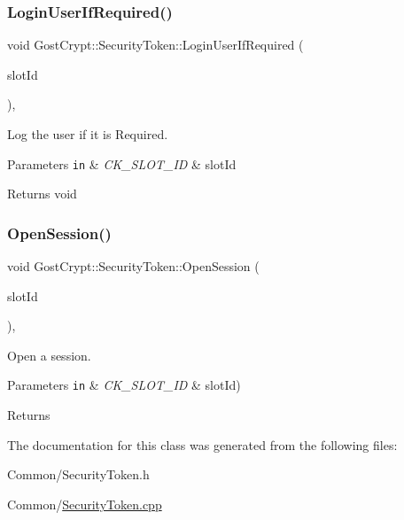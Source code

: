 \subsubsection{\texorpdfstring{Login\+User\+If\+Required()}{LoginUserIfRequired()}}
{\footnotesize\ttfamily void Gost\+Crypt\+::\+Security\+Token\+::\+Login\+User\+If\+Required (\begin{DoxyParamCaption}\item[{C\+K\+\_\+\+S\+L\+O\+T\+\_\+\+ID}]{slot\+Id }\end{DoxyParamCaption})\hspace{0.3cm}{\ttfamily [static]}, {\ttfamily [protected]}}



Log the user if it is Required. 


\begin{DoxyParams}[1]{Parameters}
\mbox{\tt in}  & {\em C\+K\+\_\+\+S\+L\+O\+T\+\_\+\+ID} & slot\+Id \\
\hline
\end{DoxyParams}
\begin{DoxyReturn}{Returns}
void 
\end{DoxyReturn}
\mbox{\label{class_gost_crypt_1_1_security_token_a259db94c79db5c606ff74676b0941b12}} 
\subsubsection{\texorpdfstring{Open\+Session()}{OpenSession()}}
{\footnotesize\ttfamily void Gost\+Crypt\+::\+Security\+Token\+::\+Open\+Session (\begin{DoxyParamCaption}\item[{C\+K\+\_\+\+S\+L\+O\+T\+\_\+\+ID}]{slot\+Id }\end{DoxyParamCaption})\hspace{0.3cm}{\ttfamily [static]}, {\ttfamily [protected]}}



Open a session. 


\begin{DoxyParams}[1]{Parameters}
\mbox{\tt in}  & {\em C\+K\+\_\+\+S\+L\+O\+T\+\_\+\+ID} & slot\+Id) \\
\hline
\end{DoxyParams}
\begin{DoxyReturn}{Returns}

\end{DoxyReturn}


The documentation for this class was generated from the following files\+:\begin{DoxyCompactItemize}
\item 
Common/Security\+Token.\+h\item 
Common/\hyperlink{_security_token_8cpp}{Security\+Token.\+cpp}\end{DoxyCompactItemize}
